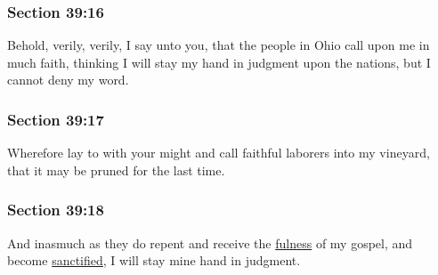 	\subsubsection{Section 39:16} %
		\label{DC39-16}

		Behold, verily, verily, I say unto you, that the people in Ohio call upon me in much faith, thinking I will stay my hand in judgment upon the nations, but I cannot deny my word.


	\subsubsection{Section 39:17} %
		\label{DC39-17}

		Wherefore lay to with your might and call faithful laborers into my vineyard, that it may be pruned for the last time.


	\subsubsection{Section 39:18} %
		\label{DC39-18}

		And inasmuch as they do repent and receive the \hyperref[FULNESS]{fulness} of my gospel, and become \hyperref[SANCTIFICATION]{sanctified}, I will stay mine hand in judgment.


